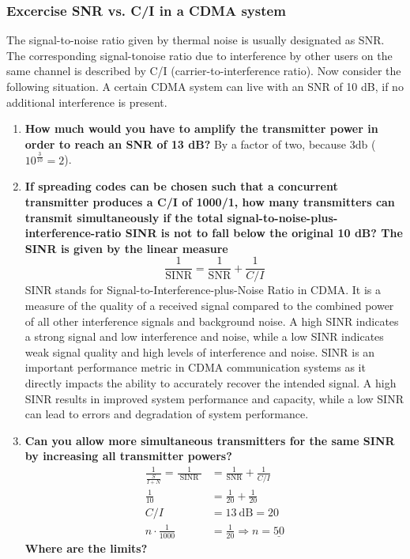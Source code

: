 \subsubsection{Excercise SNR vs. C/I in a CDMA system}
The signal-to-noise ratio given by thermal noise is usually designated as SNR. The corresponding signal-tonoise ratio due to interference by other users on the same channel is described by C/I (carrier-to-interference ratio).\newline
Now consider the following situation. A certain CDMA system can live with an SNR of 10 dB, if no additional
interference is present.
\begin{enumerate}
    \item \textbf{How much would you have to amplify the transmitter power in order to reach an SNR of 13 dB?}\newline
    By a factor of two, because 3db ($10^{\frac{3}{10}}=2$).
    \item \textbf{If spreading codes can be chosen such that a concurrent transmitter produces a C/I of 1000/1, how many transmitters can transmit simultaneously if the total signal-to-noise-plus-interference-ratio SINR is not to fall below the original 10 dB? The SINR is given by the linear measure}
    $$
    \frac{1}{\mathrm{SINR}}=\frac{1}{\mathrm{SNR}}+\frac{1}{C / I}
    $$
    SINR stands for Signal-to-Interference-plus-Noise Ratio in CDMA. It is a measure of the quality of a received signal compared to the combined power of all other interference signals and background noise. A high SINR indicates a strong signal and low interference and noise, while a low SINR indicates weak signal quality and high levels of interference and noise. SINR is an important performance metric in CDMA communication systems as it directly impacts the ability to accurately recover the intended signal. A high SINR results in improved system performance and capacity, while a low SINR can lead to errors and degradation of system performance.
    \item  \textbf{Can you allow more simultaneous transmitters for the same SINR by increasing all transmitter powers?
    $$
    \begin{aligned}
    \frac{1}{\frac{S}{I+N}}=\frac{1}{\text { SINR }} & =\frac{1}{\mathrm{SNR}}+\frac{1}{C / I} \\
    \frac{1}{10} & =\frac{1}{20}+\frac{1}{20} \\
    C / I & =13 \mathrm{~dB}=20 \\
    n \cdot \frac{1}{1000} & =\frac{1}{20} \Rightarrow n=\underline{50}
    \end{aligned}
    $$
Where are the limits?}\newline
\end{enumerate}
